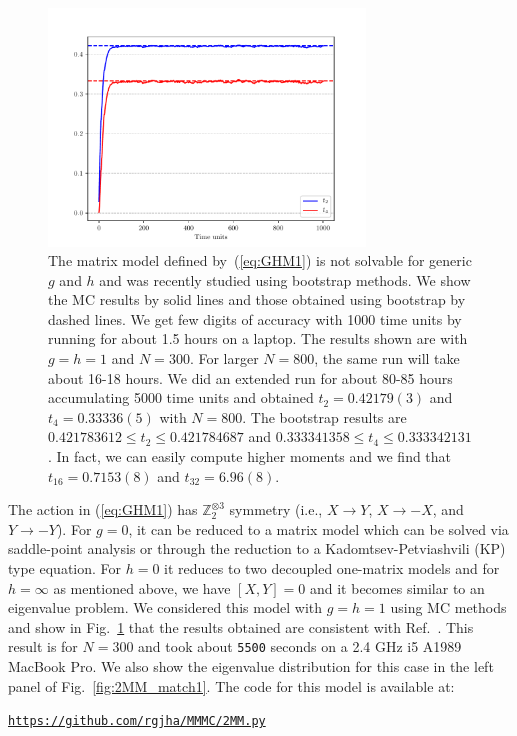 \documentclass[letter,11pt]{article}
\begin{document}
\begin{figure}[htbp] 
	\centering 
	\includegraphics[width=0.75\textwidth]{figs/plot_2MM_sym1.pdf}
	\caption{\label{fig:2MM_match}The matrix model defined by~(\ref{eq:GHM1}) is not solvable for generic $g$ and $h$ and was recently studied using bootstrap methods. We show the MC results by solid lines and those obtained using bootstrap by dashed lines. We get few digits of accuracy with 1000 time units by running for about 1.5 hours on a laptop. The results shown are with $g=h=1$ and $N=300$. For larger $N=800$, the same run will take about 16-18 hours. We did an extended run for about 80-85 hours accumulating 5000 time units and obtained $t_{2} = 0.42179(3) $ and $t_{4}=0.33336(5)$ with $N=800$. The bootstrap results are $0.421783612 \le t_{2} \le 0.421784687$ and $0.333341358 \le t_{4} \le 0.333342131$ \cite{Kazakov:2021lel}. In fact, we can easily compute higher moments and we find that
$t_{16} = 0.7153(8)$ and $t_{32} = 6.96(8)$.}
\end{figure} 

The action in (\ref{eq:GHM1}) has $\mathbb{Z}_{2}^{\otimes 3}$ symmetry 
(i.e., $X \to Y$, $X \to -X$, and $Y \to -Y$). For $g = 0$, it can be reduced to a
matrix model which can be solved via saddle-point analysis or through the reduction 
to a Kadomtsev-Petviashvili (KP) type equation. 
For $h = 0$ it reduces to two decoupled one-matrix models 
and for $h = \infty$ as mentioned above, we have $[X, Y] = 0$ and it becomes similar to an eigenvalue problem. 
We considered this model with $g=h=1$ using MC methods and show in Fig.~\ref{fig:2MM_match} that the results obtained are consistent with Ref.~\cite{Kazakov:2021lel}. 
This result is for $N = 300$ and took about \texttt{5500} seconds on a 2.4 GHz i5 A1989 MacBook Pro. We also show the eigenvalue distribution for this case in the left panel of Fig.~\ref{fig:2MM_match1}. The code for this model is available at:  
\begin{center} 
	\texttt{\href{https://github.com/rgjha/MMMC/blob/main/2MM.py}{https://github.com/rgjha/MMMC/2MM.py}}
 \end{center}
\end{document}
